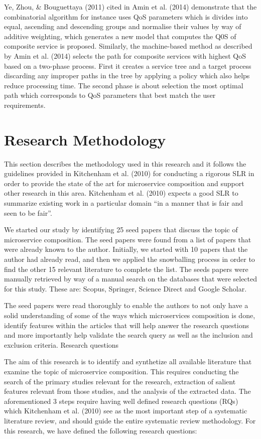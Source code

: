 \documentclass{article}
\begin{document}
Ye, Zhou, \& Bouguettaya (2011) cited in Amin et al. (2014) demonstrate that the combinatorial algorithm for instance uses QoS parameters which is divides into equal, ascending and descending groups and normalise their values by way of additive weighting, which generates a new model that computes the Q0S of composite service is proposed. Similarly, the machine-based method as described by Amin et al. (2014) selects the path for composite services with highest QoS based on a two-phase process. First it creates a service tree and a target process discarding any improper paths in the tree by applying a policy which also helps reduce processing time. The second phase is about selection the most optimal path which corresponds to QoS parameters that best match the user requirements. 




\section{Research Methodology}

This section describes the methodology used in this research and it follows the guidelines provided in Kitchenham et al. (2010) for conducting a rigorous SLR in order to provide the state of the art for microservice composition and support other research in this area. Kitchenham et al. (2010) expects a good SLR to summarize existing work in a particular domain “in a manner that is fair and seen to be fair”.

We started our study by identifying 25 seed papers that discuss the topic of microservice composition. The seed papers were found from a list of papers that were already known to the author. Initially, we started with 10 papers that the author had already read, and then we applied the snowballing process in order to find the other 15 relevant literature to complete the list. The seeds papers were manually retrieved by way of a manual search on the databases that were selected for this study. These are: Scopus, Springer, Science Direct and Google Scholar.

The seed papers were read thoroughly to enable the authors to not only have a solid understanding of some of the ways which microservices composition is done, identify features within the articles that will help answer the research questions and more importantly help validate the search query as well as the inclusion and exclusion criteria. 
Research questions

The aim of this research is to identify and synthetize all available literature that examine the topic of microservice composition. This requires conducting the search of the primary studies relevant for the research, extraction of salient features relevant from those studies, and the analysis of the extracted data. The aforementioned 3 steps require having well defined research questions (RQs) which Kitchenham et al. (2010) see as the most important step of a systematic literature review, and should guide the entire systematic review methodology. For this research, we have defined the following research questions:
\end{document}
